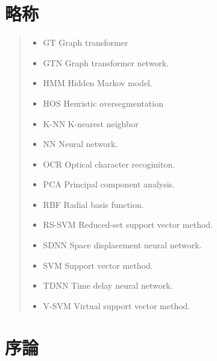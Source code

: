 \documentclass[twocolumn]{jarticle}     %
\begin{document}
\section*{略称}
\begin{quote}
  \begin{itemize}
   \item GT Graph transformer
   \item GTN Graph transformer network.
   \item HMM Hidden Markov model.
   \item HOS Heuristic oversegmentation
   \item K-NN K-nearest neighbor
   \item NN Neural network.
   \item OCR Optical character recoginiton.
   \item PCA Principal component analysis.
   \item RBF Radial basis function.
   \item RS-SVM Reduced-set support vector method.
   \item SDNN Space displacement neural network.
   \item SVM Support vector method.
   \item TDNN Time delay neural network.
   \item V-SVM Virtual support vector method.
  \end{itemize}
 \end{quote}

 \section{序論}
\end{document}
